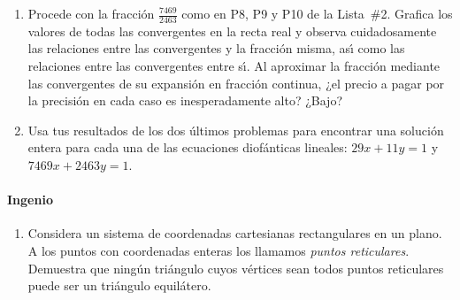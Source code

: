 \begin{enumerate}[label=P\arabic*]
	\item\label{item:fracciones:convergencia}
		Procede con la fracci\'on $\frac{7469}{2463}$ como en P8, P9 y P10 de la Lista~\#2.
		Grafica los valores de todas las convergentes en la recta real y observa
		cuidadosamente las relaciones entre las convergentes y la fracci\'on misma,
		as\'{\i} como las relaciones entre las convergentes entre s\'{\i}.
		Al aproximar la fracci\'on mediante las convergentes de su expansi\'on
		en fracci\'on continua,
		¿el precio a pagar por la precisi\'on en cada caso es inesperadamente alto? ¿Bajo?
	\item\label{item:ecuaciones:lineales}
		Usa tus resultados de los dos \'ultimos problemas para encontrar una soluci\'on
		entera para cada una de las ecuaciones diofánticas lineales:
		$29x + 11y = 1$ y $7469x + 2463y = 1$.
	\seti
\end{enumerate}
%

\paragraph{Ingenio}
\begin{enumerate}[label=P\arabic*]
	\conti
	\item\label{item:reticulo}
		Considera un sistema de coordenadas cartesianas rectangulares en un plano.
		A los puntos con coordenadas enteras los llamamos \emph{puntos reticulares}.
		Demuestra que ning\'un tri\'angulo cuyos v\'ertices sean todos puntos reticulares
		puede ser un tri\'angulo equil\'atero.
	\seti
\end{enumerate}
%

